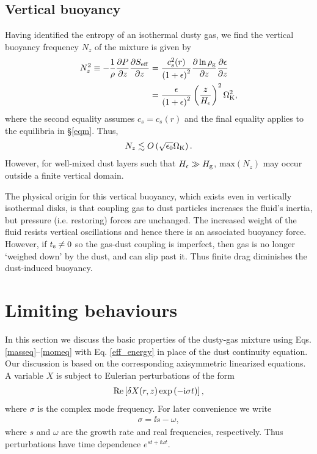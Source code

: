 \subsection{Vertical buoyancy}\label{vbuoyancy}
Having identified the entropy of an isothermal dusty gas, we find the
vertical buoyancy frequency $N_z$ of the mixture is given by 
\begin{align}
  N_z^2 \equiv - \frac{1}{\rho}\frac{\partial P}{\partial z}\frac{\partial S_\mathrm{eff}}{\partial z} &=
  \frac{c_s^2(r)}{\left(1+\epsilon\right)^2}\frac{\partial\ln\rho_\mathrm{g}}{\partial 
  z}\frac{\partial\epsilon}{\partial z} \\ &
                                  =
  \frac{\epsilon}{\left(1+\epsilon\right)^2}\left(\frac{z}{H_\epsilon}\right)^2\Omega_{\rm K}^2\notag,  
\end{align}
where the second equality assumes $c_s=c_s(r)$ and the final equality
applies to the equilibria in \S\ref{eqm}. Thus,  
\begin{align*}
N_z\lesssim
O\left(\sqrt{\epsilon_0}\Omega_{\rm K}\right). 
\end{align*}
However, for well-mixed dust layers such that $H_\epsilon \gg H_\mathrm{g}$, 
$\mathrm{max}\left(N_z\right)$ may occur outside a finite vertical domain.  

The physical origin for this vertical buoyancy, which exists even in vertically isothermal
disks, is that coupling gas to dust particles increases
the fluid's inertia, but pressure (i.e. restoring) forces are
unchanged. The increased weight of the fluid resists vertical
oscillations and hence there is an associated buoyancy force. However,
if $t_\mathrm{s}\neq0$ so the gas-dust coupling is imperfect, then gas is no
longer `weighed down' by the dust, and can slip past it. Thus finite
drag diminishes the dust-induced buoyancy.   



\section{Limiting behaviours}\label{limits}

In this section we discuss the basic properties of the 
dusty-gas mixture using Eqs.\ref{masseq}--\ref{momeq} with 
Eq. \ref{eff_energy} in place of the dust continuity equation. Our
discussion is based on the corresponding axisymmetric linearized
equations. A variable $X$ is
subject to Eulerian perturbations of the form 
\begin{align}
 \operatorname{Re}\left[ \delta X(r,z)\exp{\left(-\mathrm{i}\sigma t\right)}\right], 
\end{align}
where $\sigma$ is the complex mode frequency. For later convenience we
write 
\begin{align}
  \sigma = \ii s - \omega,
\end{align}
where $s$ and $\omega$ are the growth rate and real frequencies,
respectively. Thus perturbations have time dependence $e^{st +
  \ii\omega t}$.  


